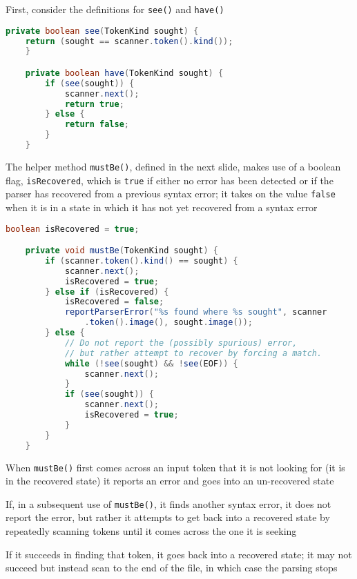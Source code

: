 \documentclass[8pt,a4paper,compress,handout]{beamer}
\begin{document}
\begin{frame}[fragile]
\pause

First, consider the definitions for \lstinline{see()} and \lstinline{have()}

\begin{lstlisting}[language=Java]
    private boolean see(TokenKind sought) {
	return (sought == scanner.token().kind());
    }

    private boolean have(TokenKind sought) {
        if (see(sought)) {
            scanner.next();
            return true;
        } else {
            return false;
        }
    }
\end{lstlisting}

\pause
\bigskip

The helper method \lstinline{mustBe()}, defined in the next slide, makes use of a boolean flag, \lstinline{isRecovered}, which is \lstinline{true} if either no error has been detected or if the parser has recovered from a previous syntax error; it takes on the value \lstinline{false} when it is in a state in which it has not yet recovered from a syntax error
\end{frame}

\begin{frame}[fragile]
\pause

\begin{lstlisting}[language=Java]
    boolean isRecovered = true;

    private void mustBe(TokenKind sought) {
        if (scanner.token().kind() == sought) {
            scanner.next();
            isRecovered = true;
        } else if (isRecovered) {
            isRecovered = false;
            reportParserError("%s found where %s sought", scanner                                                                                                                                                                             
                .token().image(), sought.image());
        } else {
            // Do not report the (possibly spurious) error,
            // but rather attempt to recover by forcing a match.
            while (!see(sought) && !see(EOF)) {
                scanner.next();
            }
            if (see(sought)) {
                scanner.next();
                isRecovered = true;
            }
        }
    }
\end{lstlisting}

\pause
\bigskip

When \lstinline{mustBe()} first comes across an input token that it is not looking for (it is in the recovered state) it reports an error and goes into an un-recovered state

\pause
\bigskip

If, in a subsequent use of \lstinline{mustBe()}, it finds another syntax error, it does not report the error, but rather it attempts to get back into a recovered state by repeatedly scanning tokens until it comes across the one it is seeking

\pause
\bigskip

If it succeeds in finding that token, it goes back into a recovered state; it may not succeed but instead scan to the end of the file, in which case the parsing stops
\end{frame}
\end{document}
